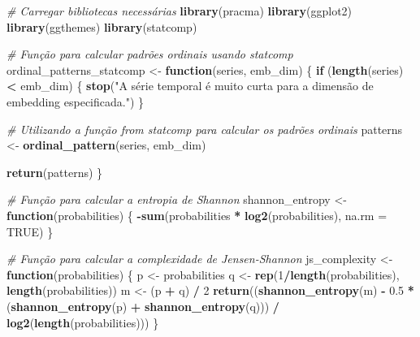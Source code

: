 \documentclass[
]{article}
\newenvironment{Shaded}{\begin{snugshade}}{\end{snugshade}}
\newcommand{\AttributeTok}[1]{\textcolor[rgb]{0.13,0.29,0.53}{#1}}
\newcommand{\CommentTok}[1]{\textcolor[rgb]{0.56,0.35,0.01}{\textit{#1}}}
\newcommand{\ConstantTok}[1]{\textcolor[rgb]{0.56,0.35,0.01}{#1}}
\newcommand{\ControlFlowTok}[1]{\textcolor[rgb]{0.13,0.29,0.53}{\textbf{#1}}}
\newcommand{\DecValTok}[1]{\textcolor[rgb]{0.00,0.00,0.81}{#1}}
\newcommand{\FloatTok}[1]{\textcolor[rgb]{0.00,0.00,0.81}{#1}}
\newcommand{\FunctionTok}[1]{\textcolor[rgb]{0.13,0.29,0.53}{\textbf{#1}}}
\newcommand{\NormalTok}[1]{#1}
\newcommand{\OtherTok}[1]{\textcolor[rgb]{0.56,0.35,0.01}{#1}}
\newcommand{\SpecialCharTok}[1]{\textcolor[rgb]{0.81,0.36,0.00}{\textbf{#1}}}
\newcommand{\StringTok}[1]{\textcolor[rgb]{0.31,0.60,0.02}{#1}}
\begin{document}
\begin{Shaded}
\begin{Highlighting}[]
\CommentTok{\# Carregar bibliotecas necessárias}
\FunctionTok{library}\NormalTok{(pracma)}
\FunctionTok{library}\NormalTok{(ggplot2)}
\FunctionTok{library}\NormalTok{(ggthemes)}
\FunctionTok{library}\NormalTok{(statcomp)}

\CommentTok{\# Função para calcular padrões ordinais usando statcomp}
\NormalTok{ordinal\_patterns\_statcomp }\OtherTok{\textless{}{-}} \ControlFlowTok{function}\NormalTok{(series, emb\_dim) \{}
  \ControlFlowTok{if}\NormalTok{ (}\FunctionTok{length}\NormalTok{(series) }\SpecialCharTok{\textless{}}\NormalTok{ emb\_dim) \{}
    \FunctionTok{stop}\NormalTok{(}\StringTok{"A série temporal é muito curta para a dimensão de embedding especificada."}\NormalTok{)}
\NormalTok{  \}}
  
  \CommentTok{\# Utilizando a função from \textasciigrave{}statcomp\textasciigrave{} para calcular os padrões ordinais}
\NormalTok{  patterns }\OtherTok{\textless{}{-}} \FunctionTok{ordinal\_pattern}\NormalTok{(series, emb\_dim)}
  
  \FunctionTok{return}\NormalTok{(patterns)}
\NormalTok{\}}


\CommentTok{\# Função para calcular a entropia de Shannon}
\NormalTok{shannon\_entropy }\OtherTok{\textless{}{-}} \ControlFlowTok{function}\NormalTok{(probabilities) \{}
  \SpecialCharTok{{-}}\FunctionTok{sum}\NormalTok{(probabilities }\SpecialCharTok{*} \FunctionTok{log2}\NormalTok{(probabilities), }\AttributeTok{na.rm =} \ConstantTok{TRUE}\NormalTok{)}
\NormalTok{\}}

\CommentTok{\# Função para calcular a complexidade de Jensen{-}Shannon}
\NormalTok{js\_complexity }\OtherTok{\textless{}{-}} \ControlFlowTok{function}\NormalTok{(probabilities) \{}
\NormalTok{  p }\OtherTok{\textless{}{-}}\NormalTok{ probabilities}
\NormalTok{  q }\OtherTok{\textless{}{-}} \FunctionTok{rep}\NormalTok{(}\DecValTok{1}\SpecialCharTok{/}\FunctionTok{length}\NormalTok{(probabilities), }\FunctionTok{length}\NormalTok{(probabilities))}
\NormalTok{  m }\OtherTok{\textless{}{-}}\NormalTok{ (p }\SpecialCharTok{+}\NormalTok{ q) }\SpecialCharTok{/} \DecValTok{2}
  \FunctionTok{return}\NormalTok{((}\FunctionTok{shannon\_entropy}\NormalTok{(m) }\SpecialCharTok{{-}} \FloatTok{0.5} \SpecialCharTok{*}\NormalTok{ (}\FunctionTok{shannon\_entropy}\NormalTok{(p) }\SpecialCharTok{+} \FunctionTok{shannon\_entropy}\NormalTok{(q))) }\SpecialCharTok{/} \FunctionTok{log2}\NormalTok{(}\FunctionTok{length}\NormalTok{(probabilities)))}
\NormalTok{\}}


\end{Highlighting}
\end{Shaded}
\end{document}
